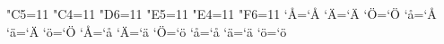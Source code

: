 %
%
%
%
%
\catcode"C5=11 %
\catcode"C4=11 %
\catcode"D6=11 %
\catcode"E5=11 %
\catcode"E4=11 %
\catcode"F6=11 %
\uccode`^^c5=`^^c5 %
\uccode`^^c4=`^^c4 %
\uccode`^^d6=`^^d6 %
\uccode`^^e5=`^^c5 %
\uccode`^^e4=`^^c4 %
\uccode`^^f6=`^^d6 %
\lccode`^^c5=`^^e5 \lccode`^^c4=`^^e4 \lccode`^^d6=`^^f6
\lccode`^^e5=`^^e5 \lccode`^^e4=`^^e4 \lccode`^^f6=`^^f6
